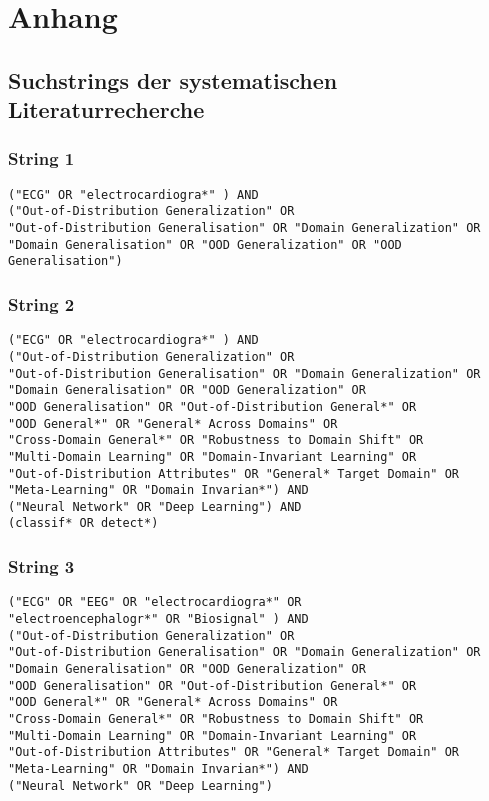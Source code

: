 \chapter{Anhang}

\section{Suchstrings der systematischen Literaturrecherche}\label{sec:strings}

\subsection*{String 1}
\begin{verbatim}
("ECG" OR "electrocardiogra*" ) AND
("Out-of-Distribution Generalization" OR
"Out-of-Distribution Generalisation" OR "Domain Generalization" OR 
"Domain Generalisation" OR "OOD Generalization" OR "OOD Generalisation")
\end{verbatim} 

\subsection*{String 2}
\begin{verbatim}
("ECG" OR "electrocardiogra*" ) AND 
("Out-of-Distribution Generalization" OR 
"Out-of-Distribution Generalisation" OR "Domain Generalization" OR 
"Domain Generalisation" OR "OOD Generalization" OR 
"OOD Generalisation" OR "Out-of-Distribution General*" OR 
"OOD General*" OR "General* Across Domains" OR
"Cross-Domain General*" OR "Robustness to Domain Shift" OR 
"Multi-Domain Learning" OR "Domain-Invariant Learning" OR 
"Out-of-Distribution Attributes" OR "General* Target Domain" OR 
"Meta-Learning" OR "Domain Invarian*") AND 
("Neural Network" OR "Deep Learning") AND 
(classif* OR detect*)
\end{verbatim} 

\newpage
\subsection*{String 3}
\begin{verbatim}
("ECG" OR "EEG" OR "electrocardiogra*" OR 
"electroencephalogr*" OR "Biosignal" ) AND 
("Out-of-Distribution Generalization" OR 
"Out-of-Distribution Generalisation" OR "Domain Generalization" OR 
"Domain Generalisation" OR "OOD Generalization" OR 
"OOD Generalisation" OR "Out-of-Distribution General*" OR 
"OOD General*" OR "General* Across Domains" OR 
"Cross-Domain General*" OR "Robustness to Domain Shift" OR 
"Multi-Domain Learning" OR "Domain-Invariant Learning" OR 
"Out-of-Distribution Attributes" OR "General* Target Domain" OR 
"Meta-Learning" OR "Domain Invarian*") AND 
("Neural Network" OR "Deep Learning")
\end{verbatim} 

